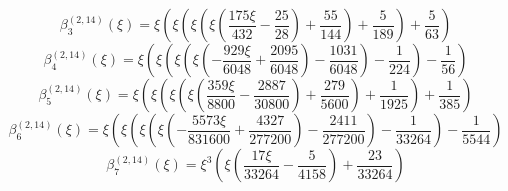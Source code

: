 \begin{equation}
\beta_{3}^{(2,14)} (\xi) =
 \xi \left(\xi \left(\xi \left(\xi \left(\frac{175 \xi}{432}
 - \frac{25}{28}\right) + \frac{55}{144}\right) + \frac{5}{189}\right) + \frac{5}{63}\right)
\end{equation}
\begin{equation}
\beta_{4}^{(2,14)} (\xi) =
 \xi \left(\xi \left(\xi \left(\xi \left(- \frac{929 \xi}{6048}
 + \frac{2095}{6048}\right) - \frac{1031}{6048}\right) - \frac{1}{224}\right) - \frac{1}{56}\right)
\end{equation}
\begin{equation}
\beta_{5}^{(2,14)} (\xi) =
 \xi \left(\xi \left(\xi \left(\xi \left(\frac{359 \xi}{8800}
 - \frac{2887}{30800}\right) + \frac{279}{5600}\right) + \frac{1}{1925}\right) + \frac{1}{385}\right)
\end{equation}
\begin{equation}
\beta_{6}^{(2,14)} (\xi) =
 \xi \left(\xi \left(\xi \left(\xi \left(- \frac{5573 \xi}{831600}
 + \frac{4327}{277200}\right) - \frac{2411}{277200}\right) - \frac{1}{33264}\right) - \frac{1}{5544}\right)
\end{equation}
\begin{equation}
\beta_{7}^{(2,14)} (\xi) =
 \xi^{3} \left(\xi \left(\frac{17 \xi}{33264} - \frac{5}{4158}\right) + \frac{23}{33264}\right)
\end{equation}
